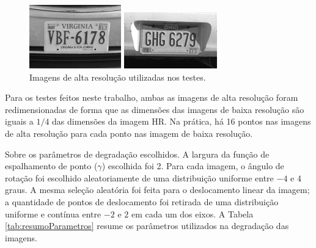 \begin{figure}[h]
	\centering
	\caption{\label{fig:hrimage}Imagens de alta resolução utilizadas nos testes.}
	\begin{minipage}[b]{.48\linewidth}
		\centering
		\includegraphics{figures/imtestes.png}
	\end{minipage}
	\begin{minipage}[b]{.48\linewidth}
		\centering
		\includegraphics{figures/imteste2s.png}
	\end{minipage}

\end{figure}

Para os testes feitos neste trabalho, ambas as imagens de alta resolução foram
redimensionadas de forma que as dimensões das imagens de baixa resolução são iguais a
$1/4$ das dimensões da imagem HR.  
Na prática, há 16 pontos nas imagens de alta resolução para cada ponto nas imagem de
baixa resolução.

Sobre os parâmetros de degradação escolhidos. A largura da função de espalhamento de ponto ($\gamma$) escolhida foi 2.
Para cada imagem, o ângulo de rotação foi escolhido aleatoriamente de uma distribuição uniforme entre $-4$ e $4$ graus.
A mesma seleção aleatória foi feita para o deslocamento linear da imagem; a quantidade de pontos de deslocamento foi retirada de uma distribuição uniforme e contínua entre $-2$ e $2$ em cada um dos eixos.
A Tabela \ref{tab:resumoParametros} resume os parâmetros utilizados na degradação das imagens.


